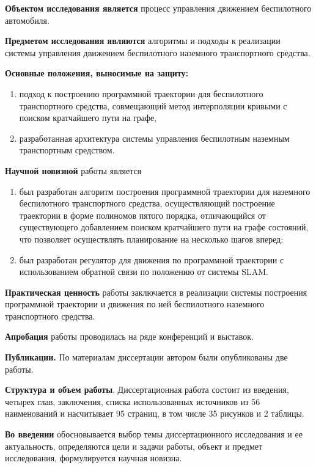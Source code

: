 \textbf{Объектом исследования является} процесс управления движением беспилотного автомобиля.

\textbf{Предметом исследования являются} алгоритмы и подходы к реализации системы управления движением
беспилотного наземного транспортного средства.

\textbf{Основные положения, выносимые на защиту:}
\begin{enumerate}
    \item подход к построению программной траектории для беспилотного транспортного средства, совмещающий метод
          интерполяции кривыми с поиском кратчайшего пути на графе,
    \item разработанная архитектура системы управления беспилотным наземным транспортным средством.
\end{enumerate}

\textbf{Научной новизной} работы является
\begin{enumerate}
    \item был разработан алгоритм построения программной траектории для наземного беспилотного транспортного
          средства, осуществляющий построение траектории в форме полиномов пятого порядка, отличающийся от существующего
          добавлением поиском кратчайшего пути на графе состояний, что позволяет осуществлять планирование на несколько
          шагов вперед;
    \item был разработан регулятор для движения по программной траектории с использованием обратной связи по положению
          от системы SLAM.
\end{enumerate}

\textbf{Практическая ценность} работы заключается в реализации системы построения программной
траектории и движения по ней беспилотного наземного транспортного средства.

\textbf{Апробация} работы проводилась на ряде конференций и выставок.

\textbf{Публикации.} По материалам диссертации автором были опубликованы две работы.

\textbf{Структура и объем работы}. Диссертационная работа состоит из введения, четырех глав, заключения,
списка использованных источников из 56 наименований и насчитывает 95 страниц, в том числе 35
рисунков и 2 таблицы.

\textbf{Во введении} обосновывается выбор темы диссертационного исследования и ее актуальность,
определяются цели и задачи работы, объект и предмет исследования, формулируется научная новизна.

